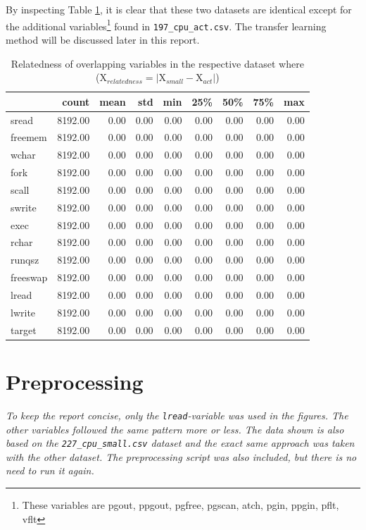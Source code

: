 \documentclass{article}
\begin{document}
By inspecting Table \ref{tab:small_stats}, it is clear that these two datasets are identical except for the additional variables\footnote[1]{\label{note1}These variables are pgout, ppgout, pgfree, pgscan, atch, pgin, ppgin, pflt, vflt} found in \texttt{197\_cpu\_act.csv}. The transfer learning method will be discussed later in this report.

\begin{table}[h!]
  \centering
  \caption{Relatedness of overlapping variables in the respective dataset where \\ (\(\mbox{X}_{relatedness} = |\mbox{X}_{small} - \mbox{X}_{act}|\))}
  \label{tab:small_stats}
  \begin{tabular}{lrrrrrrrr}
  \toprule
   & count & mean & std & min & 25\% & 50\% & 75\% & max \\
  \midrule
  sread & 8192.00 & 0.00 & 0.00 & 0.00 & 0.00 & 0.00 & 0.00 & 0.00 \\
  freemem & 8192.00 & 0.00 & 0.00 & 0.00 & 0.00 & 0.00 & 0.00 & 0.00 \\
  wchar & 8192.00 & 0.00 & 0.00 & 0.00 & 0.00 & 0.00 & 0.00 & 0.00 \\
  fork & 8192.00 & 0.00 & 0.00 & 0.00 & 0.00 & 0.00 & 0.00 & 0.00 \\
  scall & 8192.00 & 0.00 & 0.00 & 0.00 & 0.00 & 0.00 & 0.00 & 0.00 \\
  swrite & 8192.00 & 0.00 & 0.00 & 0.00 & 0.00 & 0.00 & 0.00 & 0.00 \\
  exec & 8192.00 & 0.00 & 0.00 & 0.00 & 0.00 & 0.00 & 0.00 & 0.00 \\
  rchar & 8192.00 & 0.00 & 0.00 & 0.00 & 0.00 & 0.00 & 0.00 & 0.00 \\
  runqsz & 8192.00 & 0.00 & 0.00 & 0.00 & 0.00 & 0.00 & 0.00 & 0.00 \\
  freeswap & 8192.00 & 0.00 & 0.00 & 0.00 & 0.00 & 0.00 & 0.00 & 0.00 \\
  lread & 8192.00 & 0.00 & 0.00 & 0.00 & 0.00 & 0.00 & 0.00 & 0.00 \\
  lwrite & 8192.00 & 0.00 & 0.00 & 0.00 & 0.00 & 0.00 & 0.00 & 0.00 \\
  \hline
  target & 8192.00 & 0.00 & 0.00 & 0.00 & 0.00 & 0.00 & 0.00 & 0.00 \\
  \bottomrule
  \end{tabular}
  \end{table}

\section{Preprocessing}
\emph{To keep the report concise, only the \texttt{lread}-variable was used in the figures. The other variables followed the same pattern more or less. The data shown is also based on the \texttt{227\_cpu\_small.csv} dataset and the exact same approach was taken with the other dataset. The preprocessing script was also included, but there is no need to run it again. }
\end{document}
